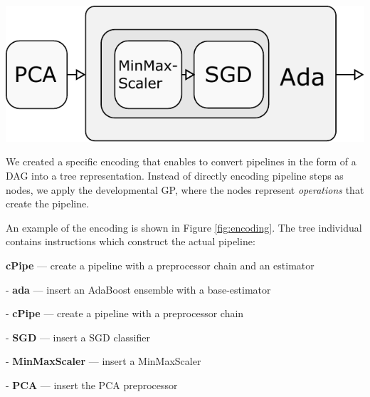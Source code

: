 \documentclass[a0paper,portrait]{baposter}
\begin{document}
\begin{poster}
{\begin{minipage}{\textwidth}
\begin{minipage}{.5\textwidth}
  \end{minipage}%
  \begin{minipage}{.5\textwidth}
    \centering
    \includegraphics[width=0.8\linewidth]{../img/ada-pdfa.pdf}
  \end{minipage}
  
  \label{fig:encoding}
\end{minipage}
\vspace{0.5em}

We created a specific encoding that enables to convert pipelines in the form of a DAG into
a tree representation. Instead of directly encoding pipeline steps as nodes, we apply the
developmental GP, where the nodes represent \emph{operations} that create the pipeline.

An example of the encoding is shown in Figure \ref{fig:encoding}. The tree individual
contains instructions which construct the actual pipeline:

\vspace{0.5em}
\textbf{cPipe} --- create a pipeline with a preprocessor chain and an estimator
\begin{compactitem}
  \item[-] \textbf{ada} --- insert an AdaBoost ensemble with a base-estimator
  \begin{compactitem}
    \item[-] \textbf{cPipe} --- create a pipeline with a preprocessor chain
    \begin{compactitem}
      \item[-] \textbf{SGD} --- insert a SGD classifier
      \item[-] \textbf{MinMaxScaler} --- insert a MinMaxScaler
    \end{compactitem}
  
  \end{compactitem}
  
  \item[-] \textbf{PCA} --- insert the PCA preprocessor
\end{compactitem}
}

\end{poster}
\end{document}
